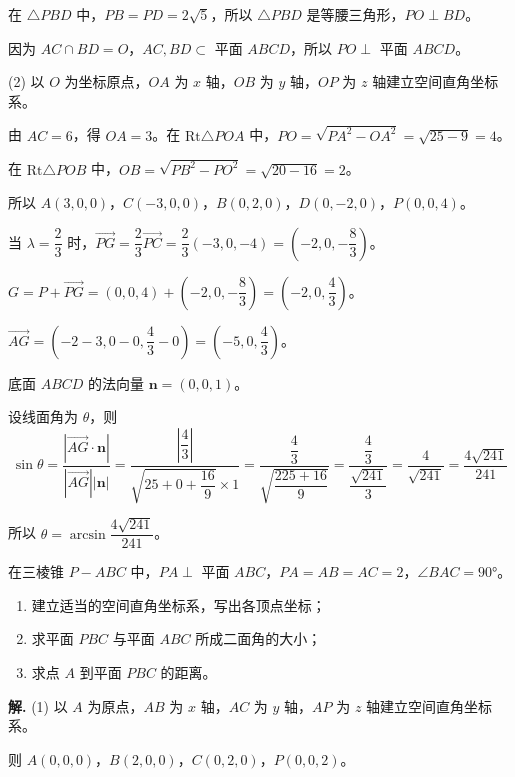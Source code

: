 \documentclass[11pt]{ctexrep}
\begin{document}
在 $\triangle PBD$ 中，$PB = PD = 2\sqrt{5}$，所以 $\triangle PBD$ 是等腰三角形，$PO \perp BD$。

因为 $AC \cap BD = O$，$AC, BD \subset$ 平面 $ABCD$，所以 $PO \perp$ 平面 $ABCD$。

(2) 以 $O$ 为坐标原点，$OA$ 为 $x$ 轴，$OB$ 为 $y$ 轴，$OP$ 为 $z$ 轴建立空间直角坐标系。

由 $AC = 6$，得 $OA = 3$。在 $\text{Rt}\triangle POA$ 中，$PO = \sqrt{PA^2 - OA^2} = \sqrt{25 - 9} = 4$。

在 $\text{Rt}\triangle POB$ 中，$OB = \sqrt{PB^2 - PO^2} = \sqrt{20 - 16} = 2$。

所以 $A(3, 0, 0)$，$C(-3, 0, 0)$，$B(0, 2, 0)$，$D(0, -2, 0)$，$P(0, 0, 4)$。

当 $\lambda = \dfrac{2}{3}$ 时，$\overrightarrow{PG} = \dfrac{2}{3}\overrightarrow{PC} = \dfrac{2}{3}(-3, 0, -4) = (-2, 0, -\dfrac{8}{3})$。

$G = P + \overrightarrow{PG} = (0, 0, 4) + (-2, 0, -\dfrac{8}{3}) = (-2, 0, \dfrac{4}{3})$。

$\overrightarrow{AG} = (-2 - 3, 0 - 0, \dfrac{4}{3} - 0) = (-5, 0, \dfrac{4}{3})$。

底面 $ABCD$ 的法向量 $\boldsymbol{n} = (0, 0, 1)$。

设线面角为 $\theta$，则
\[
\sin\theta = \dfrac{|\overrightarrow{AG} \cdot \boldsymbol{n}|}{|\overrightarrow{AG}||\boldsymbol{n}|} = \dfrac{|\dfrac{4}{3}|}{\sqrt{25 + 0 + \dfrac{16}{9}} \times 1} = \dfrac{\dfrac{4}{3}}{\sqrt{\dfrac{225 + 16}{9}}} = \dfrac{\dfrac{4}{3}}{\dfrac{\sqrt{241}}{3}} = \dfrac{4}{\sqrt{241}} = \dfrac{4\sqrt{241}}{241}
\]

所以 $\theta = \arcsin\dfrac{4\sqrt{241}}{241}$。

\begin{realexam}[2024 上海二模]
    在三棱锥 $P-ABC$ 中，$PA \perp$ 平面 $ABC$，$PA = AB = AC = 2$，$\angle BAC = 90°$。
    \begin{enumerate}
        \item 建立适当的空间直角坐标系，写出各顶点坐标；
        \item 求平面 $PBC$ 与平面 $ABC$ 所成二面角的大小；
        \item 求点 $A$ 到平面 $PBC$ 的距离。
    \end{enumerate}
\end{realexam}

\textbf{解.} (1) 以 $A$ 为原点，$AB$ 为 $x$ 轴，$AC$ 为 $y$ 轴，$AP$ 为 $z$ 轴建立空间直角坐标系。

则 $A(0, 0, 0)$，$B(2, 0, 0)$，$C(0, 2, 0)$，$P(0, 0, 2)$。
\end{document}
